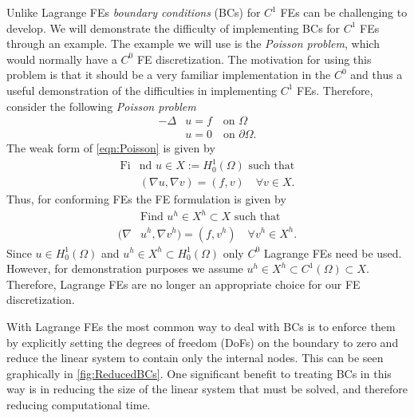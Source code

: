 Unlike Lagrange FEs \emph{boundary conditions} (BCs) for $C^1$ FEs can be
challenging to develop. We will demonstrate the difficulty of implementing BCs for
$C^1$ FEs through an example. The example we will use is the \emph{Poisson
problem}, which would normally have a $C^0$ FE discretization. The motivation
for using this problem is that it should be a very familiar implementation in
the $C^0$ and thus a useful demonstration of the difficulties in implementing
$C^1$ FEs. Therefore, consider the following \emph{Poisson problem}
\begin{equation}
  \begin{split}
    -\Delta &u = f \quad \text{on } \Omega \\
    &u = 0 \quad \text{on } \partial \Omega.
  \end{split}
  \label{eqn:Poisson}
\end{equation}
The weak form of \eqref{eqn:Poisson} is given by
\begin{equation}
  \begin{split}
    \text{Fi}&\text{nd }u \in X := H^1_0(\Omega) \text{ such that} \\
    &(\nabla u, \nabla v) = (f, v) \quad \forall v \in X.
  \end{split}
  \label{eqn:PoissonWeak}
\end{equation}
Thus, for conforming FEs the FE formulation is given by
\begin{equation}
  \begin{split}
    &\text{Find }u^h \in X^h \subset X \text{ such that} \\
    (\nabla &u^h, \nabla v^h) = (f, v^h) \quad \forall v^h \in X^h.
  \end{split}
  \label{eqn:PoissonFE}
\end{equation}
Since $u \in H^1_0(\Omega)$ and $u^h \in X^h \subset H^1_0(\Omega)$ only $C^0$
Lagrange FEs need be used. However, for demonstration purposes we assume $u^h
\in X^h \subset C^1(\Omega) \subset X$. Therefore, Lagrange FEs are no longer
an appropriate choice for our FE discretization.

With Lagrange FEs the most common way to deal with BCs is to enforce them by
explicitly setting the degrees of freedom (DoFs) on the boundary to zero and
reduce the linear system to contain only the internal nodes. This can be seen
graphically in \autoref{fig:ReducedBCs}. One significant benefit to treating BCs in
this way is in reducing the size of the linear system that must be solved, and
therefore reducing computational time.

